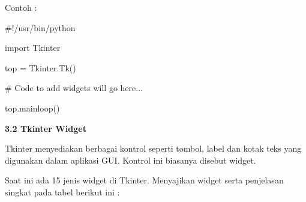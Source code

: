 \begin{itemize}
\vspace{12pt}
\vspace{12pt}
\noindent 
Contoh : \par
\noindent 
{\fontsize{10pt}{10pt}\selectfont  $  \#  $!/usr/bin/python} \par
\vspace{10pt}
\noindent 
{\fontsize{10pt}{10pt}\selectfont import Tkinter} \par
\noindent 
{\fontsize{10pt}{10pt}\selectfont top = Tkinter.Tk()} \par
\noindent 
{\fontsize{10pt}{10pt}\selectfont   $  \#  $ Code to add widgets will go here...} \par
\noindent 
{\fontsize{10pt}{10pt}\selectfont top.mainloop()} \par
\vspace{10pt}
\noindent 
\textbf{3.2 Tkinter Widget} \par
\noindent 
 \hspace*{0.5in} Tkinter menyediakan berbagai kontrol seperti tombol, label dan kotak teks yang digunakan dalam aplikasi GUI. Kontrol ini biasanya disebut widget.  \par
\noindent 
 \hspace*{0.5in} Saat ini ada 15 jenis widget di Tkinter. Menyajikan widget serta penjelasan singkat pada tabel berikut ini : \par





\end{itemize}
